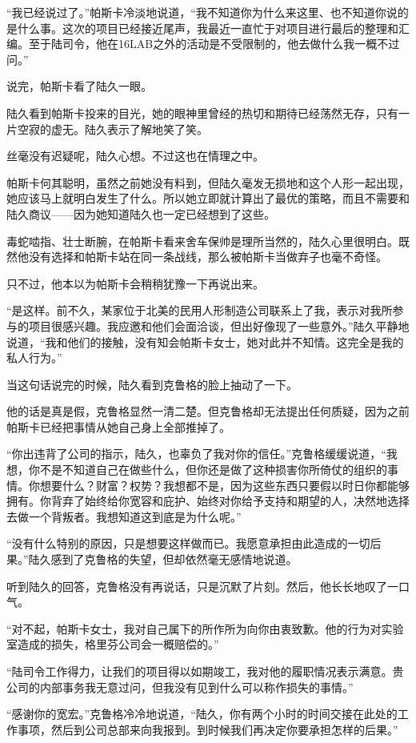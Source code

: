 “我已经说过了。”帕斯卡冷淡地说道，“我不知道你为什么来这里、也不知道你说的是什么事。这次的项目已经接近尾声，我最近一直忙于对项目进行最后的整理和汇编。至于陆司令，他在16LAB之外的活动是不受限制的，他去做什么我一概不过问。”

说完，帕斯卡看了陆久一眼。

陆久看到帕斯卡投来的目光，她的眼神里曾经的热切和期待已经荡然无存，只有一片空寂的虚无。陆久表示了解地笑了笑。

丝毫没有迟疑呢，陆久心想。不过这也在情理之中。

帕斯卡何其聪明，虽然之前她没有料到，但陆久毫发无损地和这个人形一起出现，她应该马上就明白发生了什么。所以她立即就计算出了最优的策略，而且不需要和陆久商议——因为她知道陆久也一定已经想到了这些。

毒蛇啮指、壮士断腕，在帕斯卡看来舍车保帅是理所当然的，陆久心里很明白。既然他没有选择和帕斯卡站在同一条战线，那么被帕斯卡当做弃子也毫不奇怪。

只不过，他本以为帕斯卡会稍稍犹豫一下再说出来。

“是这样。前不久，某家位于北美的民用人形制造公司联系上了我，表示对我所参与的项目很感兴趣。我应邀和他们会面洽谈，但出好像现了一些意外。”陆久平静地说道，“我和他们的接触，没有知会帕斯卡女士，她对此并不知情。这完全是我的私人行为。”

当这句话说完的时候，陆久看到克鲁格的脸上抽动了一下。

他的话是真是假，克鲁格显然一清二楚。但克鲁格却无法提出任何质疑，因为之前帕斯卡已经把事情从她自己身上全部推掉了。

“你出违背了公司的指示，陆久，也辜负了我对你的信任。”克鲁格缓缓说道，“我想，你不是不知道自己在做些什么，但你还是做了这种损害你所倚仗的组织的事情。你想要什么？财富？权势？我想都不是，因为这些东西只要假以时日你都能够拥有。你背弃了始终给你宽容和庇护、始终对你给予支持和期望的人，决然地选择去做一个背叛者。我想知道这到底是为什么呢。”

“没有什么特别的原因，只是想要这样做而已。我愿意承担由此造成的一切后果。”陆久感到了克鲁格的失望，但却依然毫无感情地说道。

听到陆久的回答，克鲁格没有再说话，只是沉默了片刻。然后，他长长地叹了一口气。

“对不起，帕斯卡女士，我对自己属下的所作所为向你由衷致歉。他的行为对实验室造成的损失，格里芬公司会一概赔偿的。”

“陆司令工作得力，让我们的项目得以如期竣工，我对他的履职情况表示满意。贵公司的内部事务我无意过问，但我没有见到什么可以称作损失的事情。”

“感谢你的宽宏。”克鲁格冷冷地说道，“陆久，你有两个小时的时间交接在此处的工作事项，然后到公司总部来向我报到。到时候我们再决定你要承担怎样的后果。”


